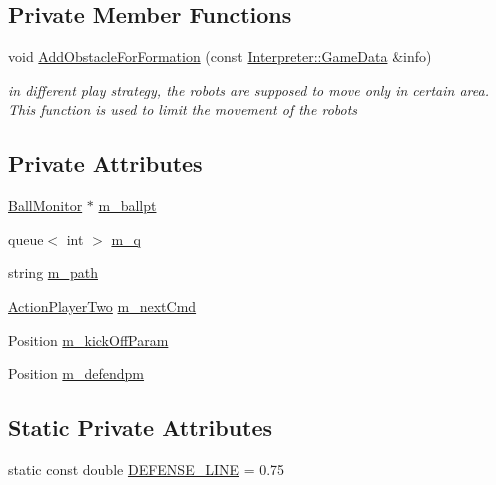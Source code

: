 \subsection*{Private Member Functions}
\begin{DoxyCompactItemize}
\item 
void \hyperlink{classPlayerTwo_a9e3341541658f54a2dfb0491a774b4d4}{AddObstacleForFormation} (const \hyperlink{structInterpreter_1_1GameData}{Interpreter::GameData} \&info)
\begin{DoxyCompactList}\small\item\em in different play strategy, the robots are supposed to move only in certain area. This function is used to limit the movement of the robots \item\end{DoxyCompactList}\end{DoxyCompactItemize}
\subsection*{Private Attributes}
\begin{DoxyCompactItemize}
\item 
\hyperlink{classBallMonitor}{BallMonitor} $\ast$ \hyperlink{classPlayerTwo_a14f2fe35deb15d4d45208273a51ec7eb}{m\_\-ballpt}
\item 
queue$<$ int $>$ \hyperlink{classPlayerTwo_ac2f70709bd48ad9f5c2435cbff1e65b3}{m\_\-q}
\item 
string \hyperlink{classPlayerTwo_af9880885ced53351b52dcc949f6df162}{m\_\-path}
\item 
\hyperlink{classPlayerTwo_a6dd2b1afb179fe02b677dd71ec5703d2}{ActionPlayerTwo} \hyperlink{classPlayerTwo_a35bab8a32976849cd72828a1a1fe8504}{m\_\-nextCmd}
\item 
Position \hyperlink{classPlayerTwo_af294f3bef80e0df881b4452c1272376a}{m\_\-kickOffParam}
\item 
Position \hyperlink{classPlayerTwo_aa6b42d687884c55d1dd30034e7952605}{m\_\-defendpm}
\end{DoxyCompactItemize}
\subsection*{Static Private Attributes}
\begin{DoxyCompactItemize}
\item 
static const double \hyperlink{classPlayerTwo_a86e1752bf84fab5d093f93633d3e51da}{DEFENSE\_\-LINE} = 0.75
\end{DoxyCompactItemize}


